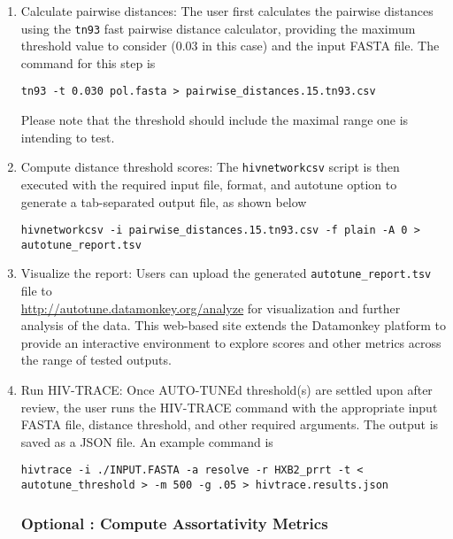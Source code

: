 \documentclass[utf8]{FrontiersinHarvard} %
\begin{document}
\begin{enumerate}

	\item{ Calculate pairwise distances: The user first calculates the pairwise distances using the {\tt tn93} fast pairwise distance calculator, providing the maximum threshold value to consider ($0.03$ in this case) and the input FASTA file. The command for this step is
	            \begin{lstlisting}[style=BashInputStyle]
 tn93 -t 0.030 pol.fasta > pairwise_distances.15.tn93.csv
\end{lstlisting}

	            Please note that the threshold should include the maximal range one is
	            intending to test.

	      }

	\item {Compute distance threshold scores: The {\tt hivnetworkcsv} script is then executed with the required input file, format, and autotune option to generate a tab-separated output file, as shown below
	      \begin{lstlisting}[style=BashInputStyle]
 hivnetworkcsv -i pairwise_distances.15.tn93.csv -f plain -A 0 > autotune_report.tsv
\end{lstlisting}
	      }

	\item {Visualize the report: Users can upload the generated {\tt autotune\_report.tsv} file to \\
	      \url{http://autotune.datamonkey.org/analyze} for visualization and further analysis of the data. This web-based site extends the Datamonkey platform \citep{weaver_datamonkey_2018} to provide an interactive environment to explore scores and other metrics across the range of tested outputs. }

	\item {Run HIV-TRACE: Once AUTO-TUNEd threshold(s) are settled upon after review, the user runs the HIV-TRACE command with the appropriate input FASTA file, distance threshold, and other required arguments. The output is saved as a JSON file. An example command is
	      \begin{lstlisting}[style=BashInputStyle]
hivtrace -i ./INPUT.FASTA -a resolve -r HXB2_prrt -t < autotune_threshold > -m 500 -g .05 > hivtrace.results.json
	\end{lstlisting}
	      }

	      \subsubsection{Optional : Compute Assortativity Metrics}


\end{enumerate}
\end{document}
